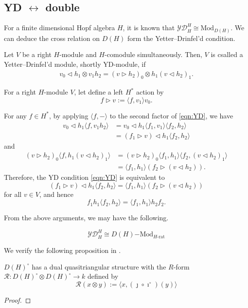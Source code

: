 
\subsection*{YD $\leftrightarrow$ double}

For a finite dimensional Hopf algebra $H$, it is known that $\mathcal{YD}^H_H \cong \mathrm{Mod}_{D(H)}$.
We can deduce the cross relation on $D(H)$ form the Yetter--Drinfel'd condition.

\begin{definition}
    Let $V$ be a right $H$-module and $H$-comodule simultaneously.
    Then, $V$ is csalled a Yetter--Drinfel'd module, shortly YD-module, if 
    \begin{align} \label{eqn:YD}
        v_0 \triangleleft h_1 \otimes v_1h_2 = (v \triangleright h_2)_0 \otimes h_1 (v \triangleleft h_2)_1.
    \end{align}
\end{definition}

For a right $H$-module $V$, let define a left $H^*$ action by
\[
    f \triangleright v := \langle f, v_1 \rangle v_0.
\]

For any $f \in H^*$, by applying $\langle f, - \rangle$ to the second factor of \eqref{eqn:YD}, we have
\begin{align*}
v_0 \triangleleft h_1 \langle f, v_1h_2 \rangle & = v_0 \triangleleft h_1 \langle f_1, v_1 \rangle \langle f_2, h_2 \rangle \\
& = (f_1 \triangleright v) \triangleleft h_1 \langle f_2, h_2 \rangle
\end{align*}
and
\begin{align*}
(v \triangleright h_2)_0 \langle f, h_1 (v \triangleleft h_2)_1 \rangle & = (v \triangleright h_2)_0 \langle f_1, h_1 \rangle \langle f_2, (v \triangleleft h_2)_1 \rangle \\
& = \langle f_1, h_1 \rangle (f_2 \triangleright (v \triangleleft h_2)).
\end{align*}
Therefore, the YD condition \eqref{eqn:YD} is equivalent to
\[
(f_1 \triangleright v) \triangleleft h_1 \langle f_2, h_2 \rangle = \langle f_1, h_1 \rangle (f_2 \triangleright (v \triangleleft h_2))
\]
for all $v \in V$, and hence
\[
f_1 h_1 \langle f_2, h_2 \rangle = \langle f_1, h_1 \rangle h_2 f_2.
\]

From the above arguments, we may have the following.

\begin{proposition}
    \[
    \mathcal{YD}^H_H \cong D(H) \mathrm{-Mod}_{H\text{-rat}}
    \]
\end{proposition}

We verify the following proposition in \cite{Kashaev21}.

\begin{proposition}
    $D(H)^\circ$ has a dual quasitriangular structure with the $R$-form $\mathscr{R}: D(H)^\circ \otimes D(H)^\circ \rightarrow k$ defined by
    \[
    \mathscr{R}(x \otimes y) := \langle x, (\jmath \circ \imath^\circ)(y) \rangle
    \]
\end{proposition}
\begin{proof}
    
\end{proof}